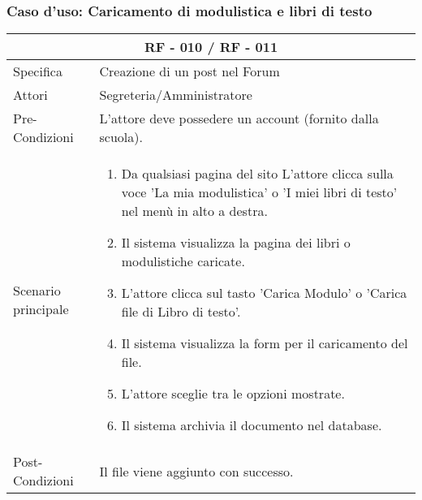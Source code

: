 \documentclass{article}
\begin{document}
\subsubsection{\textbf{Caso d'uso: Caricamento di modulistica e libri di testo}}
\begin{tabular}{ |p{3cm}|p{9cm}|  }
	\hline
	\multicolumn{2}{|c|}{\textbf{RF - 010 / RF - 011}} \\
	\hline
	Specifica& Creazione di un post nel Forum\\
	\hline
	Attori& Segreteria/Amministratore\\
	\hline
	Pre-Condizioni& L'attore deve possedere un account (fornito dalla scuola).\\
	\hline
	Scenario principale& \begin{enumerate}
		\item Da qualsiasi pagina del sito L'attore clicca sulla voce 'La mia modulistica' o 'I miei libri di testo' nel menù in alto a destra.
		\item Il sistema visualizza la pagina dei libri o modulistiche caricate.
		\item L'attore clicca sul tasto 'Carica Modulo' o 'Carica file di Libro di testo'.
		\item Il sistema visualizza la form per il caricamento del file.
		\item L'attore sceglie tra le opzioni mostrate.
		\item Il sistema archivia il documento nel database.
	\end{enumerate}\\
	\hline
	Post-Condizioni& Il file viene aggiunto con successo.\\
	\hline
\end{tabular}
\normalsize
\flushleft
\vspace{4mm} 
\end{document}
